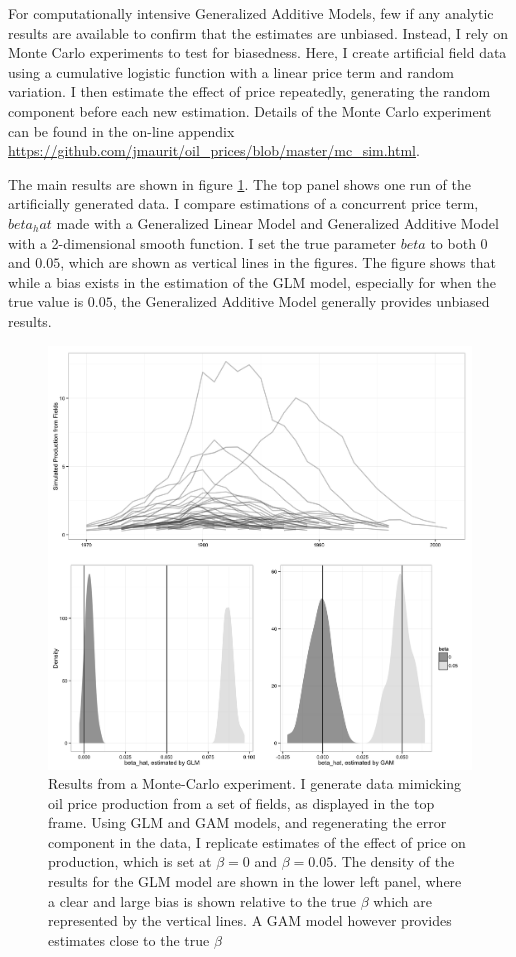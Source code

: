 \documentclass[11pt]{article}
\begin{document}
For computationally intensive Generalized Additive Models, few if any analytic results are available to confirm that the estimates are unbiased.  Instead, I rely on Monte Carlo experiments to test for biasedness.  Here, I create artificial field data using a cumulative logistic function with a linear price term and random variation. I then estimate the effect of price repeatedly, generating the random component before each new estimation. Details of the Monte Carlo experiment can be found in the on-line appendix \url{https://github.com/jmaurit/oil_prices/blob/master/mc_sim.html}.  

The main results are shown in figure \ref{mc_results}.  The top panel shows one run of the artificially generated data. I compare estimations of a concurrent price term, $beta_hat$ made with a Generalized Linear Model and Generalized Additive Model with a 2-dimensional smooth function.  I set the true parameter $beta$ to both $0$ and $0.05$, which are shown as vertical lines in the figures.  The figure shows that while a bias exists in the estimation of the GLM model, especially for when the true value is $0.05$, the Generalized Additive Model generally provides unbiased results. 

\begin{figure}
	\includegraphics[width=1\textwidth]{figures/mc_plot.png}
	\caption{Results from a Monte-Carlo experiment. I generate data mimicking oil price production from a set of fields, as displayed in the top frame. Using GLM and GAM models, and regenerating the error component in the data, I replicate estimates of the effect of price on production, which is set at $\beta = 0$ and $\beta=0.05$. The density of the results for the GLM model are shown in the lower left panel, where a clear and large bias is shown relative to the true $\beta$ which are represented by the vertical lines.  A GAM model however provides estimates close to the true $\beta$}
	\label{mc_results}
\end{figure}
\end{document}
